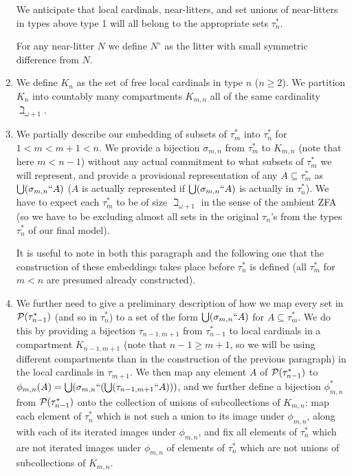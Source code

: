 \documentclass[12pt]{article}
\begin{document}
\begin{enumerate}
We anticipate that local cardinals, near-litters, and set unions of near-litters in types above type 1 will all belong to the appropriate sets $\tau^*_n$.

For any near-litter $N$ we define $N^{\circ}$ as the litter with small symmetric difference from $N$.

\item  We define $K_n$ as the set of free local cardinals in type $n$ ($n\geq 2$).  We partition $K_n$ into countably many compartments $K_{m,n}$ all of the same cardinality $\beth_{\omega+1}$.

\item We partially describe our embedding of subsets of $\tau^*_m$ into $\tau^*_n$ for $1<m<m+1<n$.  We provide a bijection $\sigma_{m,n}$ from $\tau^*_m$ to $K_{m,n}$ (note that here $m<n-1$) without any actual commitment to what subsets of $\tau^*_m$  we will represent,
and provide a provisional representation of any $A \subseteq \tau^*_m$ as $\bigcup (\sigma_{m,n}``A)$ ($A$ is actually represented if $\bigcup (\sigma_{m,n}``A)$ is actually in $\tau^*_n$).  We have to expect each
$\tau^*_m$ to be of size $\beth_{\omega+1}$ in the sense of the ambient ZFA (so we have to be excluding almost all sets in the original $\tau_n$'s from the types $\tau^*_n$ of our final model).

It is useful to note in both this paragraph and the following one that the construction of these embeddings takes place before $\tau^*_n$ is defined (all $\tau^*_m$ for $m<n$ are presumed already constructed).

\item We further need to give a preliminary description of how we map every set in ${\cal P}(\tau^*_{n-1})$ (and so in $\tau^*_n$) to a set of the form $\bigcup (\sigma_{m,n}``A)$ for $A \subseteq \tau^*_m$.  We do this by providing a bijection $\tau_{n-1,m+1}$ from $\tau^*_{n-1}$ to local cardinals in a compartment $K_{n-1,m+1}$ (note that $n-1 \geq m+1$, so we will be using different compartments than in the construction of the  previous paragraph) in the local cardinals in $\tau_{m+1}$.  We then map any element
$A$ of ${\cal P}(\tau^*_{n-1})$ to $\phi_{m,n}(A)= \bigcup (\sigma_{m,n}``(\bigcup(\tau_{n-1,m+1}``A)))$, and we further define a bijection $\phi^*_{m,n}$ from ${\cal P}(\tau^*_{n-1})$ onto the collection of unions of subcollections of $K_{m,n}$:  map each element of $\tau^*_n$ which is not such a union to its image under $\phi_{m,n}$, along with each of its iterated images under $\phi_{m,n}$,
and fix all elements of $\tau^*_n$ which are not iterated images under $\phi_{m,n}$ of elements of $\tau^*_n$ which are not unions of subcollections of $K_{m,n}$.  


\end{enumerate}
\end{document}
